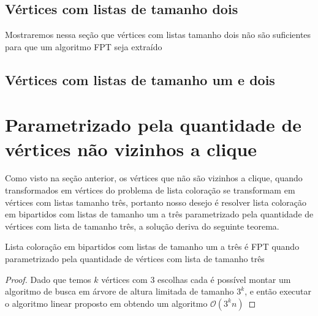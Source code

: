 \subsection{Vértices com listas de tamanho dois}
Mostraremos nessa seção que vértices com listas tamanho dois não são suficientes para que um algoritmo FPT seja extraído

\subsection{Vértices com listas de tamanho um e dois}

\section{Parametrizado pela quantidade de vértices não vizinhos a clique}
Como visto na seção anterior, os vértices que não são vizinhos a clique, quando transformados em vértices do problema de lista coloração se transformam em vértices com listas tamanho três, portanto nosso desejo é resolver lista coloração em bipartidos com listas de tamanho um a três parametrizado pela quantidade de vértices com lista de tamanho três, a solução deriva do seguinte teorema.

\begin{teorema}
 Lista coloração em bipartidos com listas de tamanho um a três é FPT quando parametrizado pela quantidade de vértices com lista de tamanho três
\end{teorema}
\begin{proof}
 Dado que temos $k$ vértices com 3 escolhas cada é possível montar um algoritmo de busca em árvore de altura limitada de tamanho $3^k$, e então executar o algoritmo linear proposto em \cite{hujter93} obtendo um algoritmo $\mathcal{O}(3^kn)$
 
\end{proof}
